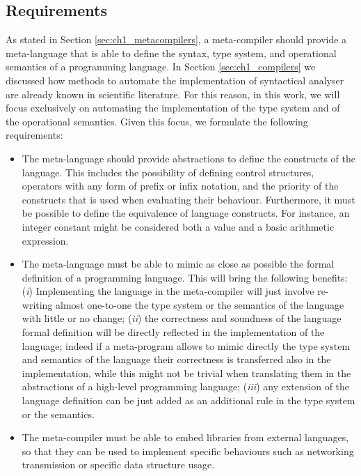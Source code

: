\subsection{Requirements}
As stated in Section \ref{sec:ch1_metacompilers}, a meta-compiler should provide a meta-language that is able to define the syntax, type system, and operational semantics of a programming language. In Section \ref{sec:ch1_compilers} we discussed how methods to automate the implementation of syntactical analyser are already known in scientific literature. For this reason, in this work, we will focus exclusively on automating the implementation of the type system and of the operational semantics. Given this focus, we formulate the following requirements:

\begin{itemize}
	\item The meta-language should provide abstractions to define the constructs of the language. This includes the possibility of defining control structures, operators with any form of prefix or infix notation, and the priority of the constructs that is used when evaluating their behaviour. Furthermore, it must be possible to define the equivalence of language constructs. For instance, an integer constant might be considered both a value and a basic arithmetic expression.
	
	\item The meta-language must be able to mimic as close as possible the formal definition of a programming language. This will bring the following benefits: (\textit{i}) Implementing the language in the meta-compiler will just involve re-writing almost one-to-one the type system or the semantics of the language with little or no change; (\textit{ii}) the correctness and soundness \cite{cardelli1996type, milner1972proving} of the language formal definition will be directly reflected in the implementation of the language; indeed if a meta-program allows to mimic directly the type system and semantics of the language their correctness is transferred also in the implementation, while this might not be trivial when translating them in the abstractions of a high-level programming language; (\textit{iii}) any extension of the language definition can be just added as an additional rule in the type system or the semantics.
	
	\item The meta-compiler must be able to embed libraries from external languages, so that they can be used to implement specific behaviours such as networking transmission or specific data structure usage.
\end{itemize}

